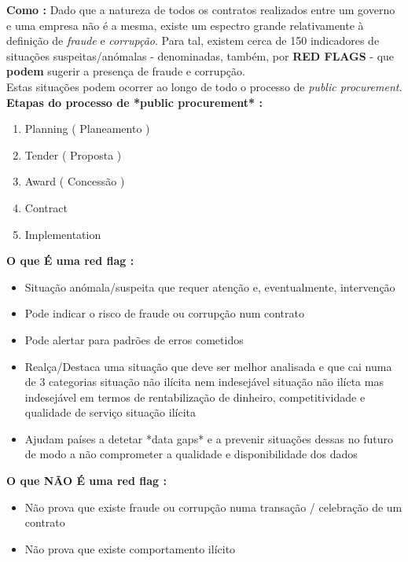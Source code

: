 \documentclass{book}
\begin{document}
  
  
\textbf{Como :} Dado que a natureza de todos os contratos realizados entre um governo e uma empresa não é a mesma, existe um espectro grande relativamente à definição de \textit{fraude} e \textit{corrupção}. Para tal, existem cerca de 150 indicadores de situações suspeitas/anómalas - denominadas, também, por \textbf{RED FLAGS} - que \textbf{podem} sugerir a presença de fraude e corrupção.\\
 
Estas situações podem ocorrer ao longo de todo o processo de \textit{public procurement}. \\
  
\textbf{Etapas do processo de *public procurement* :}
  
  \begin{enumerate}
		\item Planning ( Planeamento ) 
		\item Tender   ( Proposta ) 
		\item Award    ( Concessão )
		\item Contract
		\item Implementation
  \end{enumerate}

  
\textbf{O que É uma red flag :}
\begin{itemize}
	\item Situação anómala/suspeita que requer atenção e, eventualmente, intervenção
	\item Pode indicar o risco de fraude ou corrupção num contrato
	\item Pode alertar para padrões de erros cometidos  
	\item Realça/Destaca uma situação que deve ser melhor analisada e que cai numa de 3 categorias
		\subitem situação não ilícita nem indesejável
		\subitem situação não ilícta mas indesejável em termos de rentabilização de dinheiro, competitividade e qualidade de serviço
		\subitem situação ilícita
	\item Ajudam países a detetar *data gaps* e a prevenir situações dessas no futuro de modo a não comprometer a qualidade e disponibilidade dos dados	

\end{itemize}


\textbf{O que NÃO É uma red flag :}
\begin{itemize}
	\item Não prova que existe fraude ou corrupção numa transação / celebração de um contrato
	\item Não prova que existe comportamento ilícito 
\end{itemize}
  
\end{document}
